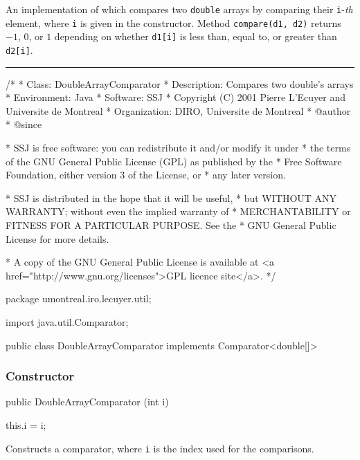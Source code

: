 
An implementation of  which compares two
\texttt{double} arrays by comparing their \texttt{i}-\emph{th} element,
where \texttt{i} is given in the constructor.
Method \texttt{compare(d1, d2)} returns $-1$, $0$, or $1$ depending on
whether \texttt{d1[i]} is less than, equal to, or greater than
\texttt{d2[i]}.

\bigskip\hrule

\begin{code}\begin{hide}
/*
 * Class:        DoubleArrayComparator
 * Description:  Compares two double's arrays
 * Environment:  Java
 * Software:     SSJ 
 * Copyright (C) 2001  Pierre L'Ecuyer and Universite de Montreal
 * Organization: DIRO, Universite de Montreal
 * @author       
 * @since

 * SSJ is free software: you can redistribute it and/or modify it under
 * the terms of the GNU General Public License (GPL) as published by the
 * Free Software Foundation, either version 3 of the License, or
 * any later version.

 * SSJ is distributed in the hope that it will be useful,
 * but WITHOUT ANY WARRANTY; without even the implied warranty of
 * MERCHANTABILITY or FITNESS FOR A PARTICULAR PURPOSE.  See the
 * GNU General Public License for more details.

 * A copy of the GNU General Public License is available at
   <a href="http://www.gnu.org/licenses">GPL licence site</a>.
 */
\end{hide}
package umontreal.iro.lecuyer.util;
\begin{hide}
import java.util.Comparator;
\end{hide}

public class DoubleArrayComparator implements Comparator<double[]> \begin{hide} {
   private int i;
\end{hide}
\end{code}

\subsubsection* {Constructor}
\begin{code}

   public DoubleArrayComparator (int i) \begin{hide} {
      this.i = i;
   }
\end{hide}\end{code}
\begin{tabb}
 Constructs a comparator, where \texttt{i} is the index
 used for the comparisons.
\end{tabb}
\begin{htmlonly}
\end{htmlonly}


